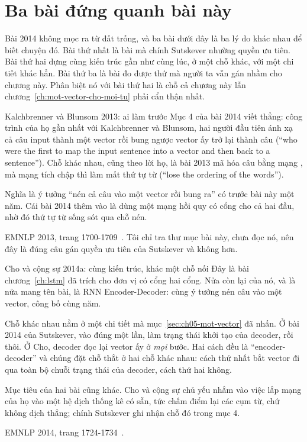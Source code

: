 \section{Ba bài đứng quanh bài này}
\label{sec:ch05-cau-noi}

%
Bài 2014 không mọc ra từ đất trống, và ba bài dưới đây là ba lý do khác nhau để
biết chuyện đó. Bài thứ nhất là bài mà chính Sutskever nhường quyền ưu tiên.
Bài thứ hai dựng cùng kiến trúc gần như cùng lúc, ở một chỗ khác, với một chi
tiết khác hẳn. Bài thứ ba là bài đo được thứ mà người ta vẫn gán nhầm cho
chương này. Phân biệt nó với bài thứ hai là chỗ cả chương này lẫn
chương~\ref{ch:mot-vector-cho-moi-tu} phải cẩn thận nhất.

\begin{bridge}{Kalchbrenner và Blunsom 2013: ai làm trước}
Mục 4 của bài 2014 viết thẳng: công trình của họ gần nhất với Kalchbrenner và
Blunsom, hai người đầu tiên ánh xạ cả câu input thành một vector rồi bung ngược
vector ấy trở lại thành câu (\enquote{who were the first to map the input
sentence into a vector and then back to a sentence}). Chỗ khác nhau, cũng theo
lời họ, là bài 2013 mã hóa câu bằng mạng , mà mạng
tích chập thì làm
mất thứ tự từ (\enquote{lose the ordering of the words}).

Nghĩa là ý tưởng \enquote{nén cả câu vào một vector rồi bung ra} có trước bài
này một năm. Cái bài 2014 thêm vào là dùng một mạng hồi quy có cổng cho cả hai
đầu, nhờ đó thứ tự từ sống sót qua chỗ nén.

EMNLP 2013, trang 1700-1709~\autocite{kalchbrenner2013recurrent}. Tôi chỉ tra
thư mục bài này, chưa đọc nó, nên đây là đúng câu gán quyền ưu tiên của
Sutskever và không hơn.
\end{bridge}

\begin{bridge}{Cho và cộng sự 2014a: cùng kiến trúc, khác một chỗ nối}
Đây là bài chương~\ref{ch:lstm} đã trích cho đơn vị có cổng hai cổng. Nửa còn
lại của nó, và là nửa mang tên bài, là RNN Encoder-Decoder: cùng ý tưởng nén
câu vào một vector, công bố cùng năm.

Chỗ khác nhau nằm ở một chi tiết mà mục~\ref{sec:ch05-mot-vector} đã nhấn. Ở
bài 2014 của Sutskever,  vào đúng một lần,
làm trạng thái khởi tạo của decoder, rồi thôi. Ở Cho, decoder đọc lại vector ấy
ở \emph{mọi} bước. Hai cách đều là \enquote{encoder-decoder} và chúng đặt chỗ
thắt ở hai chỗ khác nhau: cách thứ nhất bắt vector đi qua toàn bộ chuỗi trạng
thái của decoder, cách thứ hai không.

Mục tiêu của hai bài cũng khác. Cho và cộng sự chủ yếu nhắm vào việc lắp mạng
của họ vào một hệ dịch thống kê có sẵn, tức chấm điểm lại các cụm từ, chứ không
dịch thẳng; chính Sutskever ghi nhận chỗ đó trong mục 4.

EMNLP 2014, trang 1724-1734~\autocite{cho2014encdec}.
\end{bridge}

